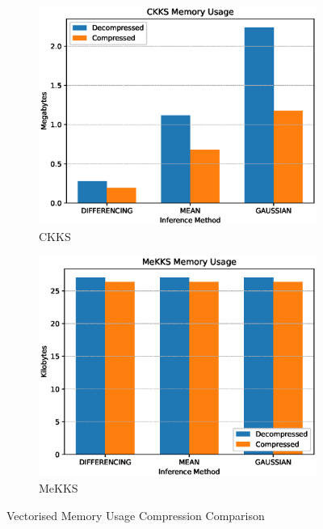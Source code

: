 \begin{figure}[ht]
    \centering
    \begin{subfigure}[b]{0.495\textwidth}
        \centering
        \includegraphics[width=\textwidth]{figures/memUsageCKKS.eps}
        \caption{CKKS}
    \end{subfigure}
    \hfill
    \begin{subfigure}[b]{0.495\textwidth}
        \centering
        \includegraphics[width=\textwidth]{figures/memUsageMeKKS.eps}
        \caption{MeKKS}
    \end{subfigure}
    \caption{Vectorised Memory Usage Compression Comparison}
    \label{fig:compression2}
\end{figure}


